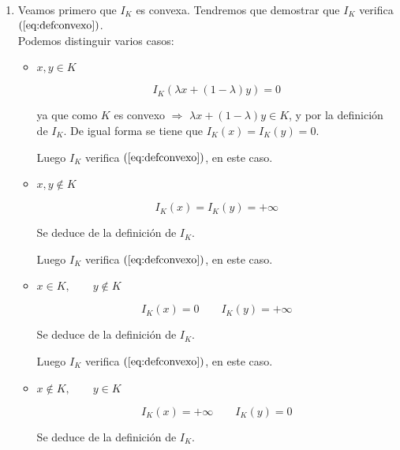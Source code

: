\begin{demosejer}
\ %
\begin{enumerate}
\item Veamos primero que $I_K$ es convexa. Tendremos que demostrar que $I_K$ verifica $(\ref{eq:defconvexo})$.\\

Podemos distinguir varios casos:

\begin{itemize}
\item $x,y \in K$ %

\begin{displaymath}
I_K (\lambda x + (1-\lambda )y) = 0
\end{displaymath}

ya que como $K$ es convexo $\Longrightarrow$ $\lambda x + (1-\lambda )y \in K$,
y por la definici\'on de $I_K$. De igual forma se tiene que
$I_K(x) = I_K(y) = 0$.\newline

Luego $I_K$ verifica $(\ref{eq:defconvexo})$, en este caso.

\item $x,y \notin K$

\begin{displaymath}
I_K(x) = I_K(y) = + \infty
\end{displaymath}

Se deduce de la definici\'on de $I_K$.\newline

Luego $I_K$ verifica $(\ref{eq:defconvexo})$, en este caso.

\item $x \in K, \qquad y \notin K$

\begin{displaymath}
I_K(x) = 0 \qquad I_K(y) = +\infty
\end{displaymath}

Se deduce de la definici\'on de $I_K$.\newline

Luego $I_K$ verifica $(\ref{eq:defconvexo})$, en este caso.

\item $x \notin K, \qquad y \in K$

\begin{displaymath}
I_K(x) = +\infty \qquad I_K(y) = 0
\end{displaymath}

Se deduce de la definici\'on de $I_K$.\newline


\end{itemize}
\end{enumerate}
\end{demosejer}
